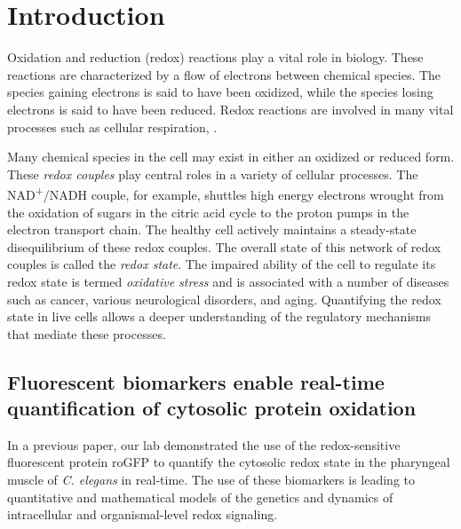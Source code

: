 
\chapter{Introduction} %

\label{Chapter1} %


Oxidation and reduction (redox) reactions play a vital role in biology. These reactions are characterized by a flow of electrons between chemical species. The species gaining electrons is said to have been oxidized, while the species losing electrons is said to have been reduced. Redox reactions are involved in many vital processes such as cellular respiration, .

Many chemical species in the cell may exist in either an oxidized or reduced form. These \textit{redox couples} play central roles in a variety of cellular processes. The NAD\textsuperscript{{+}}/NADH couple, for example, shuttles high energy electrons wrought from the oxidation of sugars in the citric acid cycle to the proton pumps in the electron transport chain. The healthy cell actively maintains a steady-state disequilibrium of these redox couples. The overall state of this network of redox couples is called the \textit{redox state}. The impaired ability of the cell to regulate its redox state is termed \textit{oxidative stress} and is associated with a number of diseases such as cancer, various neurological disorders, and aging. Quantifying the redox state in live cells allows a deeper understanding of the regulatory mechanisms that mediate these processes.

\section{Fluorescent biomarkers enable real-time quantification of cytosolic protein oxidation} \label{fluorescenceIntro}
In a previous paper, our lab demonstrated the use of the redox-sensitive fluorescent protein roGFP to quantify the cytosolic redox state in the pharyngeal muscle of \textit{C. elegans} in real-time. The use of these biomarkers is leading to quantitative and mathematical models of the genetics and dynamics of intracellular and organismal-level redox signaling.

